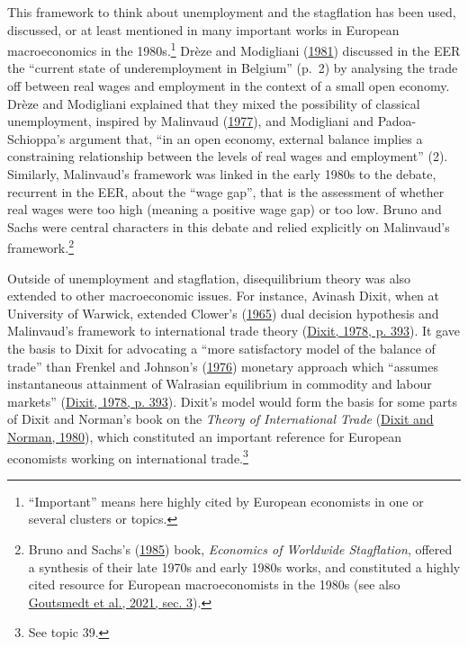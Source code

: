 \documentclass[
]{article}
\begin{document}
This framework to think about unemployment and the stagflation has been
used, discussed, or at least mentioned in many important works in
European macroeconomics in the 1980s.\footnote{``Important'' means here
  highly cited by European economists in one or several clusters or
  topics.} Drèze and Modigliani
(\protect\hyperlink{ref-dreze1981}{1981}) discussed in the EER the
``current state of underemployment in Belgium'' (p.~2) by analysing the
trade off between real wages and employment in the context of a small
open economy. Drèze and Modigliani explained that they mixed the
possibility of classical unemployment, inspired by Malinvaud
(\protect\hyperlink{ref-malinvaud1977}{1977}), and Modigliani and
Padoa-Schioppa's argument that, ``in an open economy, external balance
implies a constraining relationship between the levels of real wages and
employment'' (2). Similarly, Malinvaud's framework was linked in the
early 1980s to the debate, recurrent in the EER, about the ``wage gap'',
that is the assessment of whether real wages were too high (meaning a
positive wage gap) or too low. Bruno and Sachs were central characters
in this debate and relied explicitly on Malinvaud's
framework.\footnote{Bruno and Sachs's
  (\protect\hyperlink{ref-brunosachs1985}{1985}) book, \emph{Economics
  of Worldwide Stagflation}, offered a synthesis of their late 1970s and
  early 1980s works, and constituted a highly cited resource for
  European macroeconomists in the 1980s (see also
  \protect\hyperlink{ref-goutsmedt2021}{Goutsmedt et al., 2021, sec.
  3}).}

Outside of unemployment and stagflation, disequilibrium theory was also
extended to other macroeconomic issues. For instance, Avinash Dixit,
when at University of Warwick, extended Clower's
(\protect\hyperlink{ref-clower1965}{1965}) dual decision hypothesis and
Malinvaud's framework to international trade theory
(\protect\hyperlink{ref-dixit1978}{Dixit, 1978, p. 393}). It gave the
basis to Dixit for advocating a ``more satisfactory model of the balance
of trade'' than Frenkel and Johnson's
(\protect\hyperlink{ref-frenkel1976}{1976}) monetary approach which
``assumes instantaneous attainment of Walrasian equilibrium in commodity
and labour markets'' (\protect\hyperlink{ref-dixit1978}{Dixit, 1978, p.
393}). Dixit's model would form the basis for some parts of Dixit and
Norman's book on the \emph{Theory of International Trade}
(\protect\hyperlink{ref-dixit1980}{Dixit and Norman, 1980}), which
constituted an important reference for European economists working on
international trade.\footnote{See topic 39.}
\end{document}
